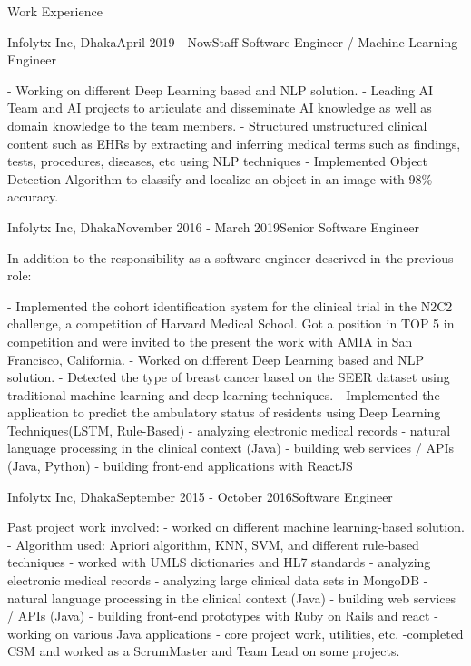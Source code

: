 \documentclass{resume} %
\begin{document}
\begin{rSection}{Work Experience}

\begin{rSubsection}{Infolytx Inc, Dhaka}{April 2019 - Now}{Staff Software Engineer / Machine Learning Engineer }{}
\item 
- Working on different Deep Learning based and NLP solution. 
-  Leading AI Team and AI projects to articulate and disseminate AI knowledge as well as domain knowledge to the team members.
- Structured unstructured clinical content such as EHRs by extracting and inferring medical terms such as findings, tests, procedures, diseases, etc using NLP techniques
- Implemented Object Detection Algorithm to classify and localize an object in an image with 98\% accuracy.
\end{rSubsection}

\begin{rSubsection}{Infolytx Inc, Dhaka}{November 2016 - March 2019}{Senior Software Engineer}{}
\item 
In addition to the responsibility as a software engineer descrived in the previous role:

- Implemented the cohort identification system for the clinical trial in the N2C2 challenge, a competition of Harvard Medical School.  Got a position in TOP 5 in competition and were invited to the present the work with AMIA in San Francisco, California.
- Worked on different Deep Learning based and NLP solution. 
- Detected the type of breast cancer based on the SEER dataset using traditional machine learning and deep learning techniques.
- Implemented  the application to predict the ambulatory status of residents using Deep Learning Techniques(LSTM, Rule-Based) 
- analyzing electronic medical records
- natural language processing in the clinical context (Java)
- building web services / APIs (Java, Python)
- building front-end applications with ReactJS

\end{rSubsection}

\begin{rSubsection}{Infolytx Inc, Dhaka}{September 2015 - October 2016}{Software Engineer}{}
\item 
Past project work involved: 
- worked on different machine learning-based solution. 
- Algorithm used:  Apriori algorithm, KNN, SVM, and different rule-based techniques 
- worked with UMLS dictionaries and HL7 standards
- analyzing electronic medical records
- analyzing large clinical data sets in MongoDB
- natural language processing in the clinical context (Java)
- building web services / APIs (Java)
- building front-end prototypes with  Ruby on Rails and react
- working on various Java applications - core project work, utilities, etc.
-completed CSM and worked as a ScrumMaster and Team Lead on some projects.
\end{rSubsection}


\end{rSection}
\end{document}
